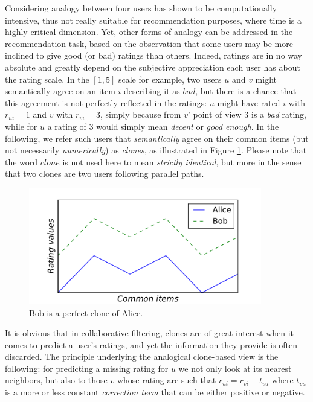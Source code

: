 Considering analogy between four users has shown to be computationally
intensive, thus not really suitable for recommendation purposes, where time is
a highly critical dimension. Yet, other forms of analogy can be addressed in
the recommendation task, based on the observation that some users may be more
inclined to give good (or bad) ratings than others. Indeed, ratings are in no
way absolute and greatly depend on the subjective appreciation each user has
about the rating scale. In the $[1, 5]$ scale for example, two users $u$ and
$v$ might semantically agree on an item $i$ describing it as $bad$, but there
is a chance that this agreement is not perfectly reflected in the ratings: $u$
might have rated $i$ with $r_{ui} = 1$ and $v$ with $r_{vi} = 3$, simply
because from $v$' point of view $3$ is a \textit{bad} rating, while for $u$ a
rating of $3$ would simply mean \textit{decent} or \textit{good enough}.  In
the following, we refer such users that \textit{semantically} agree on their
common items (but not necessarily \textit{numerically}) as \textit{clones}, as
illustrated in Figure \ref{FIG_CLONES}. Please note that the word $clone$ is
not used here to mean \textit{strictly identical}, but more in the sense that
two clones are two users following parallel paths.

\begin{figure}[!h]
\centering
\includegraphics[width=4in]{figures/clones.pdf}
\caption{Bob is a perfect clone of Alice.}
\label{FIG_CLONES}
\end{figure}

It is obvious that in collaborative filtering, clones are of great interest when
it comes to predict a user's ratings, and yet the information they provide is
often discarded.  The principle underlying the analogical clone-based view is
the following: for predicting a missing rating for $u$ we not only look at its
nearest neighbors, but also to those $v$ whose rating are such that $r_{ui} =
r_{vi} + t_{vu}$ where $t_{vu}$ is a more or less constant \textit{correction
term} that can be either positive or negative.

